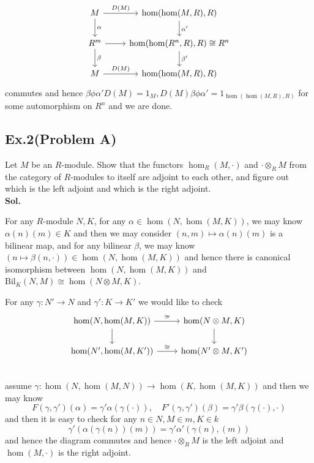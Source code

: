 \documentclass[lang=en,11pt,a4paper,citestyle =authoryear]{elegantpaper}
\begin{document}
    \[
    \begin{tikzcd}
        M\arrow[r,"D(M)"]\arrow[d,"\alpha"] & \hom(\hom(M,R),R)\arrow[d,"\alpha'"] \\
        R^m\arrow[r]\arrow[d,"\beta"] & \hom(\hom(R^n,R),R)\arrow[d,"\beta'"] \cong R^n \\
        M\arrow[r,"D(M)"] & \hom(\hom(M,R),R)
    \end{tikzcd}
    \]
    commutes and hence $\beta\phi\alpha'D(M) = 1_M,D(M)\beta\phi\alpha' = 1_{\hom(\hom(M,R),R)}$ for some automorphism on $R^n$ and we are done.
\par 
\vspace{0.5em}

\subsection*{Ex.2(Problem A)} 
Let $M$ be an $R$-module. Show that the functors $\hom_R(M,\cdot)$ and $\cdot \otimes_R M$ from the category of $R$-modules to itself are adjoint to each other, and figure out which is the left adjoint and which is the right adjoint.
\vspace{0.5em}\\
\textbf{Sol.} \par
For any $R$-module $N,K$, for any $\alpha \in \hom(N,\hom(M,K))$, we may know $\alpha(n)(m)\in K$ and then we may consider $(n,m)\mapsto \alpha(n)(m)$ is a bilinear map, and for any bilinear $\beta$, we may know $(n\mapsto \beta(n,\cdot))\in \hom(N,\hom(M,K))$ and hence there is canonical isomorphism between $\hom(N,\hom(M,K))$ and $\text{Bil}_K(N,M)\cong \hom(N\otimes M, K)$.\par
For any $\gamma:  N'\to N$ and $\gamma':K\to K'$ we would like to check
\[
\begin{tikzcd}
    \hom(N,\hom(M,K))\arrow[r,"\cong"]\arrow[d] & \hom(N \otimes M, K)\arrow[d] \\
    \hom(N',\hom(M,K'))\arrow[r,"\cong"] & \hom(N'\otimes M, K') \\
\end{tikzcd}
\]
assume $\gamma: \hom(N,\hom(M,N))\to \hom(K,\hom(M,K))$ and then we may know 
\[F(\gamma,\gamma')(\alpha) = \gamma'\alpha(\gamma(\cdot)),\quad F'(\gamma,\gamma')(\beta) = \gamma'\beta(\gamma(\cdot),\cdot)\]
and then it is easy to check for any $n\in N,M\in m, K\in k$
\[
\gamma'(\alpha(\gamma(n))(m)) = \gamma'\alpha'(\gamma(n),(m))
\]
and hence the diagram commutes and hence $\cdot \otimes_R M$ is the left adjoint and $\hom(M,\cdot)$ is the right adjoint.
\par 
\vspace{0.5em}
\end{document}
